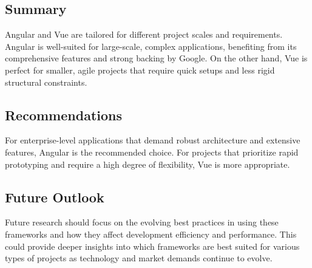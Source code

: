 \documentclass[conference]{IEEEtran}
\begin{document}
\subsection{Summary}
Angular and Vue are tailored for different project scales and requirements. Angular is well-suited for large-scale, complex applications, benefiting from its comprehensive features and strong backing by Google. On the other hand, Vue is perfect for smaller, agile projects that require quick setups and less rigid structural constraints.

\subsection{Recommendations}
For enterprise-level applications that demand robust architecture and extensive features, Angular is the recommended choice. For projects that prioritize rapid prototyping and require a high degree of flexibility, Vue is more appropriate.

\subsection{Future Outlook}
Future research should focus on the evolving best practices in using these frameworks and how they affect development efficiency and performance. This could provide deeper insights into which frameworks are best suited for various types of projects as technology and market demands continue to evolve.
\end{document}
